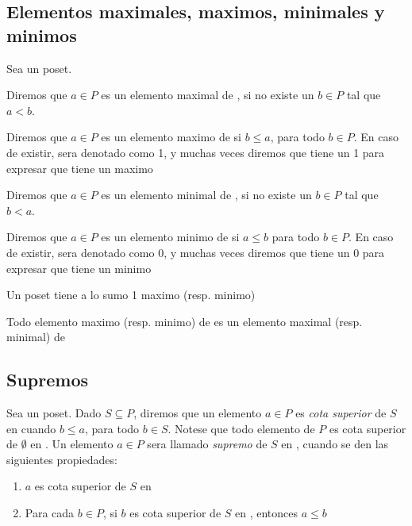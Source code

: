 \subsection{Elementos maximales, maximos, minimales y minimos}
\begin{definition}
  Sea \poset un poset.
  
  Diremos que $a \in P$ es un elemento maximal de \poset, si no existe un $b \in P$ tal que $a < b$.

  Diremos que $a \in P$ es un elemento maximo de \poset si $b \leq a$, para todo $b \in P$.
  En caso de existir, sera denotado como 1, y muchas veces diremos que \poset tiene un 1 para expresar que \poset
  tiene un maximo

  Diremos que $a \in P$ es un elemento minimal de \poset, si no existe un $b \in P$ tal que $b < a$.
  
  Diremos que $a \in P$ es un elemento minimo de \poset si $a \leq b$ para todo $b \in P$.
  En caso de existir, sera denotado como 0, y muchas veces diremos que \poset tiene un 0 para expresar que \poset
  tiene un minimo
\end{definition}

\begin{remark}
  Un poset \poset tiene a lo sumo 1 maximo (resp. minimo)
\end{remark}
\begin{remark}
  Todo elemento maximo (resp. minimo) de \poset es un elemento maximal (resp. minimal) de \poset
\end{remark}

\subsection{Supremos}
Sea \poset un poset. Dado $S \subseteq P$, diremos que un elemento $a \in P$ es \emph{cota superior} de $S$
en \poset cuando $b \leq a$, para todo $b \in S$. Notese que todo elemento de $P$ es cota superior de $\emptyset$
en \poset. Un elemento $a \in P$ sera llamado \emph{supremo} de $S$ en \poset, cuando se den las siguientes propiedades:
\begin{enumerate}
  \item $a$ es cota superior de $S$ en \poset
  \item Para cada $b \in P$, si $b$ es cota superior de $S$ en \poset, entonces $a \leq b$
\end{enumerate}
